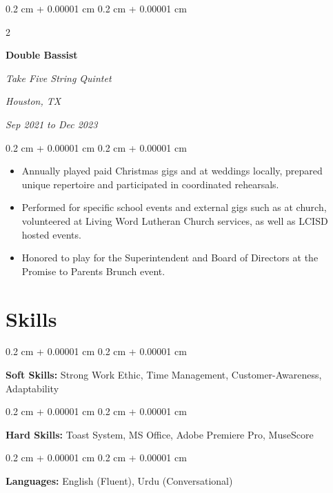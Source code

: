 \documentclass[10pt, letterpaper]{article}
\newenvironment{highlights}{
    \begin{itemize}[
        topsep=0.10 cm,
        parsep=0.10 cm,
        partopsep=0pt,
        itemsep=0pt,
        leftmargin=0.4 cm + 10pt
    ]
}{
    \end{itemize}
} %
\newenvironment{onecolentry}{
    \begin{adjustwidth}{
        0.2 cm + 0.00001 cm
    }{
        0.2 cm + 0.00001 cm
    }
}{
    \end{adjustwidth}
} %
\newenvironment{twocolentry}[2][]{
    \onecolentry
    \def\secondColumn{#2}
    \setcolumnwidth{\fill, 4.5 cm}
    \begin{paracol}{2}
}{
    \switchcolumn \raggedleft \secondColumn
    \end{paracol}
    \endonecolentry
} %
\begin{document}
        \vspace{0.2 cm}

        \begin{twocolentry}{
        \textit{Houston, TX}    
            
        \textit{Sep 2021 to Dec 2023}}
            \textbf{Double Bassist}
            
            \textit{Take Five String Quintet}
        \end{twocolentry}

        \vspace{0.10 cm}
        \begin{onecolentry}
            \begin{highlights}
                \item Annually played paid Christmas gigs and at weddings locally, prepared unique repertoire and participated in coordinated rehearsals.
                \item Performed for specific school events and external gigs such as at church, volunteered at Living Word Lutheran Church services, as well as LCISD hosted events.
                \item Honored to play for the Superintendent and Board of Directors at the Promise to Parents Brunch event.
            \end{highlights}
        \end{onecolentry}



    
    \section{Skills}



        
        \begin{onecolentry}
            \textbf{Soft Skills:} Strong Work Ethic, Time Management, Customer-Awareness, Adaptability
        \end{onecolentry}

        \vspace{0.2 cm}

        \begin{onecolentry}
            \textbf{Hard Skills:} Toast System, MS Office, Adobe Premiere Pro, MuseScore
        \end{onecolentry}

        \vspace{0.2 cm}

        \begin{onecolentry}
            \textbf{Languages:} English (Fluent), Urdu (Conversational)
        \end{onecolentry}
\end{document}
